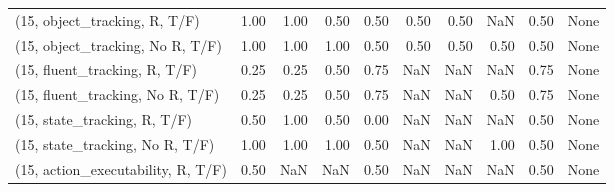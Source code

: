 \begin{table*}[h!]
\begin{adjustbox}{width=2\columnwidth,center}
\begin{tabular}{lrrr|rrr|rrr}
\midrule
(15, object\_tracking, R, T/F)         &                      1.00 &                  1.00 &                      0.50 &                          0.50 &                      0.50 &                          0.50 &                                    NaN &                               0.50 &                                  None \\
(15, object\_tracking, No R, T/F)      &                      1.00 &                  1.00 &                      1.00 &                          0.50 &                      0.50 &                          0.50 &                                   0.50 &                               0.50 &                                  None \\
(15, fluent\_tracking, R, T/F)         &                      0.25 &                  0.25 &                      0.50 &                          0.75 &                       NaN &                           NaN &                                    NaN &                               0.75 &                                  None \\
(15, fluent\_tracking, No R, T/F)      &                      0.25 &                  0.25 &                      0.50 &                          0.75 &                       NaN &                           NaN &                                   0.50 &                               0.75 &                                  None \\
(15, state\_tracking, R, T/F)          &                      0.50 &                  1.00 &                      0.50 &                          0.00 &                       NaN &                           NaN &                                    NaN &                               0.50 &                                  None \\
(15, state\_tracking, No R, T/F)       &                      1.00 &                  1.00 &                      1.00 &                          0.50 &                       NaN &                           NaN &                                   1.00 &                               0.50 &                                  None \\
(15, action\_executability, R, T/F)    &                      0.50 &                   NaN &                       NaN &                          0.50 &                       NaN &                           NaN &                                    NaN &                               0.50 &                                  None \\

\end{tabular}
\end{adjustbox}
\end{table*}

